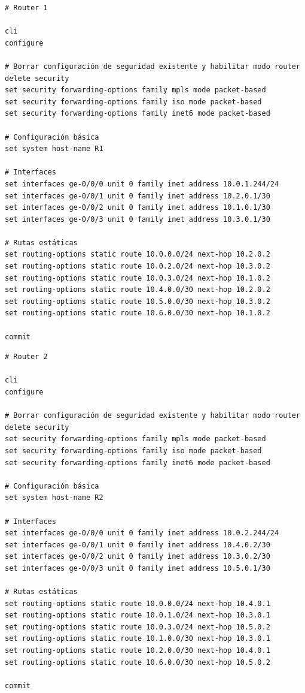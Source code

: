 \documentclass[%
    school=etsisi,%
    degree=61TI,%
]{upm-report}
\begin{document}
\begin{lstlisting}[breaklines]
# Router 1

cli
configure

# Borrar configuración de seguridad existente y habilitar modo router
delete security
set security forwarding-options family mpls mode packet-based
set security forwarding-options family iso mode packet-based
set security forwarding-options family inet6 mode packet-based

# Configuración básica
set system host-name R1

# Interfaces
set interfaces ge-0/0/0 unit 0 family inet address 10.0.1.244/24
set interfaces ge-0/0/1 unit 0 family inet address 10.2.0.1/30
set interfaces ge-0/0/2 unit 0 family inet address 10.1.0.1/30
set interfaces ge-0/0/3 unit 0 family inet address 10.3.0.1/30

# Rutas estáticas
set routing-options static route 10.0.0.0/24 next-hop 10.2.0.2
set routing-options static route 10.0.2.0/24 next-hop 10.3.0.2
set routing-options static route 10.0.3.0/24 next-hop 10.1.0.2
set routing-options static route 10.4.0.0/30 next-hop 10.2.0.2
set routing-options static route 10.5.0.0/30 next-hop 10.3.0.2
set routing-options static route 10.6.0.0/30 next-hop 10.1.0.2

commit
\end{lstlisting}

\begin{lstlisting}[breaklines]
# Router 2

cli
configure

# Borrar configuración de seguridad existente y habilitar modo router
delete security
set security forwarding-options family mpls mode packet-based
set security forwarding-options family iso mode packet-based
set security forwarding-options family inet6 mode packet-based

# Configuración básica
set system host-name R2

# Interfaces
set interfaces ge-0/0/0 unit 0 family inet address 10.0.2.244/24
set interfaces ge-0/0/1 unit 0 family inet address 10.4.0.2/30
set interfaces ge-0/0/2 unit 0 family inet address 10.3.0.2/30
set interfaces ge-0/0/3 unit 0 family inet address 10.5.0.1/30

# Rutas estáticas
set routing-options static route 10.0.0.0/24 next-hop 10.4.0.1
set routing-options static route 10.0.1.0/24 next-hop 10.3.0.1
set routing-options static route 10.0.3.0/24 next-hop 10.5.0.2
set routing-options static route 10.1.0.0/30 next-hop 10.3.0.1
set routing-options static route 10.2.0.0/30 next-hop 10.4.0.1
set routing-options static route 10.6.0.0/30 next-hop 10.5.0.2

commit   
\end{lstlisting}
\end{document}
